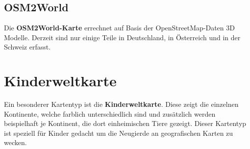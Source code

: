 \documentclass[10pt]{scrreprt}
\begin{document}
\vspace{3mm}
\begin{figure}[!htb]
	\centering
    \hspace{5mm}
\end{figure} 



\subsection{OSM2World}  
Die \textbf{OSM2World-Karte} errechnet auf Basis der OpenStreetMap-Daten 3D Modelle. Derzeit sind nur einige Teile in Deutschland, in Österreich und in der Schweiz erfasst.



\section{Kinderweltkarte}  
Ein besonderer Kartentyp ist die \textbf{Kinderweltkarte}. Diese zeigt die einzelnen Kontinente, welche farblich unterschiedlich sind und zusätzlich werden beispielhaft je Kontinent, die dort einheimischen Tiere gezeigt. Dieser Kartentyp ist speziell für Kinder gedacht um die Neugierde an geografischen Karten zu wecken.
\end{document}
